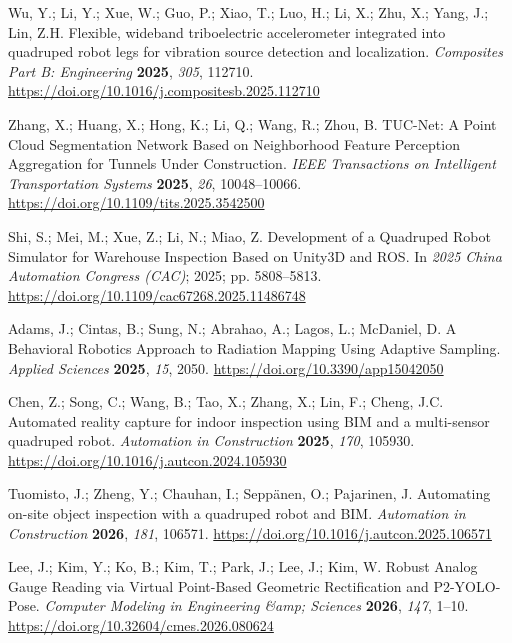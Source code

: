 Wu, Y.; Li, Y.; Xue, W.; Guo, P.; Xiao, T.; Luo, H.; Li, X.; Zhu, X.; Yang, J.; Lin, Z.H. Flexible, wideband triboelectric accelerometer integrated into quadruped robot legs for vibration source detection and localization. \emph{Composites Part B: Engineering} \textbf{2025}, \emph{305}, 112710. \url{https://doi.org/10.1016/j.compositesb.2025.112710}

Zhang, X.; Huang, X.; Hong, K.; Li, Q.; Wang, R.; Zhou, B. TUC-Net: A Point Cloud Segmentation Network Based on Neighborhood Feature Perception Aggregation for Tunnels Under Construction. \emph{IEEE Transactions on Intelligent Transportation Systems} \textbf{2025}, \emph{26}, 10048--10066. \url{https://doi.org/10.1109/tits.2025.3542500}

Shi, S.; Mei, M.; Xue, Z.; Li, N.; Miao, Z. Development of a Quadruped Robot Simulator for Warehouse Inspection Based on Unity3D and ROS. In \emph{2025 China Automation Congress (CAC)}; 2025; pp. 5808--5813. \url{https://doi.org/10.1109/cac67268.2025.11486748}

Adams, J.; Cintas, B.; Sung, N.; Abrahao, A.; Lagos, L.; McDaniel, D. A Behavioral Robotics Approach to Radiation Mapping Using Adaptive Sampling. \emph{Applied Sciences} \textbf{2025}, \emph{15}, 2050. \url{https://doi.org/10.3390/app15042050}

Chen, Z.; Song, C.; Wang, B.; Tao, X.; Zhang, X.; Lin, F.; Cheng, J.C. Automated reality capture for indoor inspection using BIM and a multi-sensor quadruped robot. \emph{Automation in Construction} \textbf{2025}, \emph{170}, 105930. \url{https://doi.org/10.1016/j.autcon.2024.105930}

Tuomisto, J.; Zheng, Y.; Chauhan, I.; Seppänen, O.; Pajarinen, J. Automating on-site object inspection with a quadruped robot and BIM. \emph{Automation in Construction} \textbf{2026}, \emph{181}, 106571. \url{https://doi.org/10.1016/j.autcon.2025.106571}

Lee, J.; Kim, Y.; Ko, B.; Kim, T.; Park, J.; Lee, J.; Kim, W. Robust Analog Gauge Reading via Virtual Point-Based Geometric Rectification and P2-YOLO-Pose. \emph{Computer Modeling in Engineering \&amp; Sciences} \textbf{2026}, \emph{147}, 1--10. \url{https://doi.org/10.32604/cmes.2026.080624}

